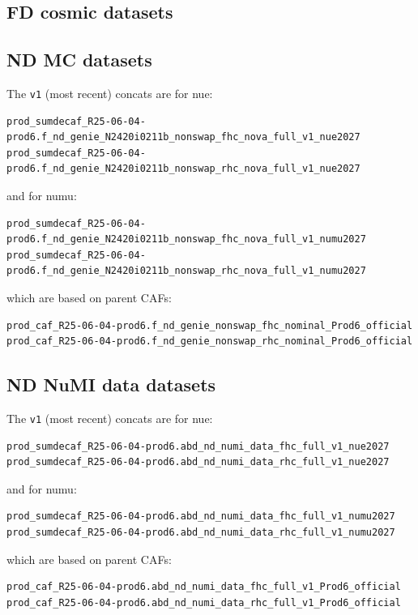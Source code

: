 \documentclass{article}
\begin{document}

\subsection{FD cosmic datasets}

\subsection{ND MC datasets}
The \texttt{v1} (most recent) concats are for nue:
{\smaller\begin{verbatim}
prod_sumdecaf_R25-06-04-prod6.f_nd_genie_N2420i0211b_nonswap_fhc_nova_full_v1_nue2027
prod_sumdecaf_R25-06-04-prod6.f_nd_genie_N2420i0211b_nonswap_rhc_nova_full_v1_nue2027
\end{verbatim}}
and for numu:
{\smaller\begin{verbatim}
prod_sumdecaf_R25-06-04-prod6.f_nd_genie_N2420i0211b_nonswap_fhc_nova_full_v1_numu2027
prod_sumdecaf_R25-06-04-prod6.f_nd_genie_N2420i0211b_nonswap_rhc_nova_full_v1_numu2027
\end{verbatim}}
which are based on parent CAFs:
{\smaller\begin{verbatim}
prod_caf_R25-06-04-prod6.f_nd_genie_nonswap_fhc_nominal_Prod6_official
prod_caf_R25-06-04-prod6.f_nd_genie_nonswap_rhc_nominal_Prod6_official
\end{verbatim}}

\subsection{ND NuMI data datasets}
The \texttt{v1} (most recent) concats are for nue:
{\smaller\begin{verbatim}
prod_sumdecaf_R25-06-04-prod6.abd_nd_numi_data_fhc_full_v1_nue2027
prod_sumdecaf_R25-06-04-prod6.abd_nd_numi_data_rhc_full_v1_nue2027
\end{verbatim}}
and for numu:
{\smaller\begin{verbatim}
prod_sumdecaf_R25-06-04-prod6.abd_nd_numi_data_fhc_full_v1_numu2027
prod_sumdecaf_R25-06-04-prod6.abd_nd_numi_data_rhc_full_v1_numu2027
\end{verbatim}}
which are based on parent CAFs:
{\smaller\begin{verbatim}
prod_caf_R25-06-04-prod6.abd_nd_numi_data_fhc_full_v1_Prod6_official
prod_caf_R25-06-04-prod6.abd_nd_numi_data_rhc_full_v1_Prod6_official
\end{verbatim}}
\end{document}
